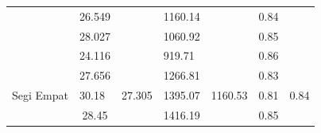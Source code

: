 \documentclass[conference]{IEEEtran}
\begin{document}
\begin{table}[]
\begin{tabular}{|l|cc|cc|cc|}
                                                      & \multicolumn{1}{c|}{26.549}                         & \cellcolor[HTML]{FFFFFF}                         & \multicolumn{1}{c|}{1160.14}                         & \cellcolor[HTML]{FFFFFF}                           & \multicolumn{1}{c|}{0.84}                         & \cellcolor[HTML]{FFFFFF}                        \\ \cline{2-2} \cline{4-4} \cline{6-6}
                                                      & \multicolumn{1}{l|}{28.027}                         & \cellcolor[HTML]{FFFFFF}                         & \multicolumn{1}{l|}{1060.92}                         & \cellcolor[HTML]{FFFFFF}                           & \multicolumn{1}{l|}{0.85}                         & \cellcolor[HTML]{FFFFFF}                        \\ \cline{2-2} \cline{4-4} \cline{6-6}
                                                      & \multicolumn{1}{l|}{24.116}                         & \cellcolor[HTML]{FFFFFF}                         & \multicolumn{1}{l|}{919.71}                          & \cellcolor[HTML]{FFFFFF}                           & \multicolumn{1}{l|}{0.86}                         & \cellcolor[HTML]{FFFFFF}                        \\ \cline{2-2} \cline{4-4} \cline{6-6}
                                                      & \multicolumn{1}{l|}{27.656}                         & \cellcolor[HTML]{FFFFFF}                         & \multicolumn{1}{l|}{1266.81}                         & \cellcolor[HTML]{FFFFFF}                           & \multicolumn{1}{l|}{0.83}                         & \cellcolor[HTML]{FFFFFF}                        \\ \cline{2-2} \cline{4-4} \cline{6-6}
  \multirow{-5}{*}{Segi Empat}         & \multicolumn{1}{l|}{30.18}                         & \multirow{-5}{*}{\cellcolor[HTML]{FFFFFF}27.305} & \multicolumn{1}{l|}{1395.07}                         & \multirow{-5}{*}{\cellcolor[HTML]{FFFFFF}1160.53} & \multicolumn{1}{l|}{0.81}                         & \multirow{-5}{*}{\cellcolor[HTML]{FFFFFF}0.84} \\ \hline
                                                      & \multicolumn{1}{c|}{\cellcolor[HTML]{FFFFFF}28.45} & \cellcolor[HTML]{FFFFFF}                         & \multicolumn{1}{c|}{\cellcolor[HTML]{FFFFFF}1416.19} & \cellcolor[HTML]{FFFFFF}                           & \multicolumn{1}{c|}{\cellcolor[HTML]{FFFFFF}0.85} & \cellcolor[HTML]{FFFFFF}                        \\ \cline{2-2} \cline{4-4} \cline{6-6}

\end{tabular}
\end{table}
\end{document}
